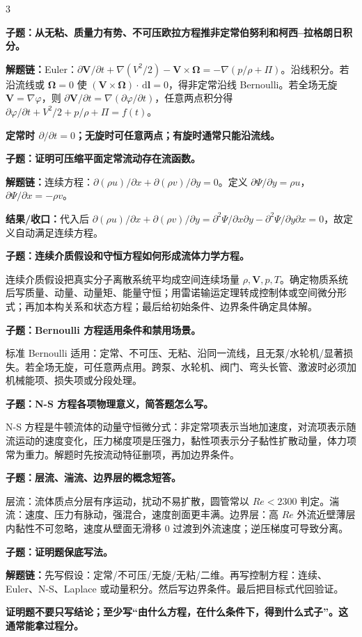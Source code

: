 \documentclass[a4paper]{article}
\newcommand{\qt}[1]{\vspace{0.25pt}\colorbox{Q}{\parbox{\dimexpr\linewidth-2\fboxsep}{\color{white}\bfseries #1}}\par}
\newcommand{\ans}[1]{\colorbox{G}{\parbox{\dimexpr\linewidth-2\fboxsep}{#1}}\par}
\newcommand{\warn}[1]{\colorbox{Y}{\parbox{\dimexpr\linewidth-2\fboxsep}{\color{E}\bfseries #1}}\par}
\newcommand{\chain}[1]{{\color{A}\bfseries 解题链：}#1\par}
\newcommand{\res}[1]{{\color{E}\bfseries 结果/收口：}#1\par}
\newcommand{\dd}{\,\mathrm d}
\begin{document}
\begin{multicols}{3}
\qt{子题：从无粘、质量力有势、不可压欧拉方程推非定常伯努利和柯西--拉格朗日积分。}
\chain{Euler：$\partial\bm V/\partial t+\nabla(V^2/2)-\bm V\times\bm\Omega=-\nabla(p/\rho+\Pi)$。沿线积分。若沿流线或 $\bm\Omega=0$ 使 $(\bm V\times\bm\Omega)\cdot\dd\bm l=0$，得非定常沿线 Bernoulli。若全场无旋 $\bm V=\nabla\varphi$，则 $\partial\bm V/\partial t=\nabla(\partial\varphi/\partial t)$，任意两点积分得 $\partial\varphi/\partial t+V^2/2+p/\rho+\Pi=f(t)$。}
\warn{定常时 $\partial/\partial t=0$；无旋时可任意两点；有旋时通常只能沿流线。}

\qt{子题：证明可压缩平面定常流动存在流函数。}
\chain{连续方程：$\partial(\rho u)/\partial x+\partial(\rho v)/\partial y=0$。定义 $\partial\Psi/\partial y=\rho u$，$\partial\Psi/\partial x=-\rho v$。}
\res{代入后 $\partial(\rho u)/\partial x+\partial(\rho v)/\partial y=\partial^2\Psi/\partial x\partial y-\partial^2\Psi/\partial y\partial x=0$，故定义自动满足连续方程。}

\qt{子题：连续介质假设和守恒方程如何形成流体力学方程。}
\ans{连续介质假设把真实分子离散系统平均成空间连续场量 $\rho,\bm V,p,T$。确定物质系统后写质量、动量、动量矩、能量守恒；用雷诺输运定理转成控制体或空间微分形式；再加本构关系和状态方程；最后给初始条件、边界条件确定具体解。}

\qt{子题：Bernoulli 方程适用条件和禁用场景。}
\ans{标准 Bernoulli 适用：定常、不可压、无粘、沿同一流线，且无泵/水轮机/显著损失。若全场无旋，可任意两点用。跨泵、水轮机、阀门、弯头长管、激波时必须加机械能项、损失项或分段处理。}

\qt{子题：N-S 方程各项物理意义，简答题怎么写。}
\ans{N-S 方程是牛顿流体的动量守恒微分式：非定常项表示当地加速度，对流项表示随流运动的速度变化，压力梯度项是压强力，黏性项表示分子黏性扩散动量，体力项常为重力。解题时先按流动特征删项，再加边界条件。}

\qt{子题：层流、湍流、边界层的概念短答。}
\ans{层流：流体质点分层有序运动，扰动不易扩散，圆管常以 $Re<2300$ 判定。湍流：速度、压力有脉动，强混合，速度剖面更丰满。边界层：高 $Re$ 外流近壁薄层内黏性不可忽略，速度从壁面无滑移 0 过渡到外流速度；逆压梯度可导致分离。}

\qt{子题：证明题保底写法。}
\chain{先写假设：定常/不可压/无旋/无粘/二维。再写控制方程：连续、Euler、N-S、Laplace 或动量积分。然后写边界条件。最后把目标式代回验证。}
\warn{证明题不要只写结论；至少写“由什么方程，在什么条件下，得到什么式子”。这通常能拿过程分。}



\end{multicols}
\end{document}
